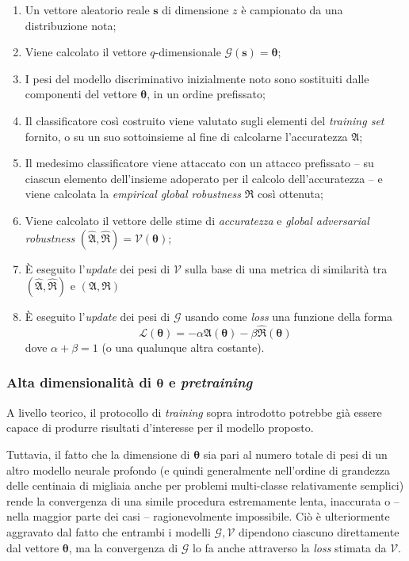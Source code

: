 \documentclass[a4paper, twoside]{article}
\begin{document}
\begin{enumerate}
	\item Un vettore aleatorio reale $\boldsymbol{s}$ di dimensione $z$ è campionato da una distribuzione nota;
	\item Viene calcolato il vettore $q$-dimensionale $\mathcal{G}(\boldsymbol{s}) = \boldsymbol{\theta}$;
	\item I pesi del modello discriminativo inizialmente noto sono sostituiti dalle componenti del vettore $\boldsymbol{\theta}$, in un ordine prefissato;
	\item Il classificatore così costruito viene valutato sugli elementi del \textit{training set} fornito, o su un suo sottoinsieme al fine di calcolarne l'accuratezza $\mathfrak{A}$;
	\item Il medesimo classificatore viene attaccato con un attacco prefissato -- su ciascun elemento dell'insieme adoperato per il calcolo dell'accuratezza -- e viene calcolata la \textit{empirical global robustness} $\mathfrak{R}$ così ottenuta;
	\item Viene calcolato il vettore delle stime di \textit{accuratezza} e \textit{global adversarial robustness} $(\hat{\mathfrak{A}},\hat{\mathfrak{R}}) = \mathcal{V}(\boldsymbol{\theta})$;
	\item È eseguito l'\textit{update} dei pesi di $\mathcal{V}$ sulla base di una metrica di similarità tra $(\hat{\mathfrak{A}},\hat{\mathfrak{R}})$ e $({\mathfrak{A}},{\mathfrak{R}})$
	\item È eseguito l'\textit{update} dei pesi di $\mathcal{G}$ usando come \textit{loss} una funzione della forma $$\mathcal{L}(\boldsymbol{\theta}) =  -\alpha \hat{\mathfrak{A}}(\boldsymbol{\theta}) - \beta \hat{\mathfrak{R}}(\boldsymbol{\theta})$$ dove $\alpha + \beta = 1$ (o una qualunque altra costante).
\end{enumerate}

\subsubsection{Alta dimensionalità di $\boldsymbol{\theta}$ e \textit{pretraining}}

A livello teorico, il protocollo di \textit{training} sopra introdotto potrebbe già essere capace di produrre risultati d'interesse per il modello proposto.

Tuttavia, il fatto che la dimensione di $\boldsymbol{\theta}$ sia pari al numero totale di pesi di un altro modello neurale profondo (e quindi generalmente nell'ordine di grandezza delle centinaia di migliaia anche per problemi multi-classe relativamente semplici) rende la convergenza di una simile procedura estremamente lenta, inaccurata o -- nella maggior parte dei casi -- ragionevolmente impossibile. Ciò è ulteriormente aggravato dal fatto che entrambi i modelli $\mathcal{G}, \mathcal{V}$ dipendono ciascuno direttamente dal vettore $\boldsymbol{\theta}$, ma la convergenza di $\mathcal{G}$ lo fa anche attraverso la \textit{loss} stimata da $\mathcal{V}$.
\end{document}
